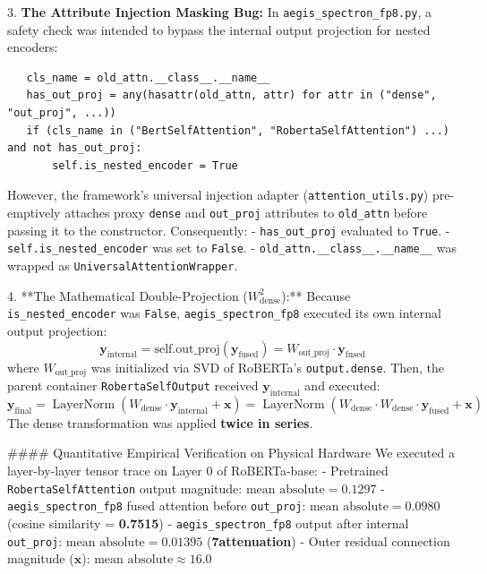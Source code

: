 {{{{3. \textbf{The Attribute Injection Masking Bug:}
   In \texttt{aegis_spectron_fp8.py}, a safety check was intended to bypass the internal output projection for nested encoders:
   
\begin{lstlisting}
   cls_name = old_attn.__class__.__name__
   has_out_proj = any(hasattr(old_attn, attr) for attr in ("dense", "out_proj", ...))
   if (cls_name in ("BertSelfAttention", "RobertaSelfAttention") ...) and not has_out_proj:
       self.is_nested_encoder = True
\end{lstlisting}

   However, the framework's universal injection adapter (\texttt{attention_utils.py}) pre-emptively attaches proxy \texttt{dense} and \texttt{out_proj} attributes to \texttt{old_attn} before passing it to the constructor. Consequently:
   - \texttt{has_out_proj} evaluated to \texttt{True}.
   - \texttt{self.is_nested_encoder} was set to \texttt{False}.
   - \texttt{old_attn.__class__.__name__} was wrapped as \texttt{UniversalAttentionWrapper}.

4. **The Mathematical Double-Projection ($W_{\text{dense}}^2$):**
   Because \texttt{is_nested_encoder} was \texttt{False}, \texttt{aegis_spectron_fp8} executed its own internal output projection:
   $$\mathbf{y}_{\text{internal}} = \text{self.out\_proj}(\mathbf{y}_{\text{fused}}) = W_{\text{out\_proj}} \cdot \mathbf{y}_{\text{fused}}$$
   where $W_{\text{out\_proj}}$ was initialized via SVD of RoBERTa's \texttt{output.dense}.
   Then, the parent container \texttt{RobertaSelfOutput} received $\mathbf{y}_{\text{internal}}$ and executed:
   $$\mathbf{y}_{\text{final}} = \operatorname{LayerNorm}\left( W_{\text{dense}} \cdot \mathbf{y}_{\text{internal}} + \mathbf{x} \right) = \operatorname{LayerNorm}\left( W_{\text{dense}} \cdot W_{\text{dense}} \cdot \mathbf{y}_{\text{fused}} + \mathbf{x} \right)$$
   The dense transformation was applied \textbf{twice in series}.

#### Quantitative Empirical Verification on Physical Hardware
We executed a layer-by-layer tensor trace on Layer 0 of RoBERTa-base:
- Pretrained \texttt{RobertaSelfAttention} output magnitude: $\text{mean absolute} = \mathbf{0.1297}$
- \texttt{aegis_spectron_fp8} fused attention before \texttt{out_proj}: $\text{mean absolute} = \mathbf{0.0980}$ (cosine similarity = \textbf{0.7515})
- \texttt{aegis_spectron_fp8} output after internal \texttt{out_proj}: $\text{mean absolute} = \mathbf{0.01395}$ (\textbf{7\times  attenuation})
- Outer residual connection magnitude ($\mathbf{x}$): $\text{mean absolute} \approx \mathbf{16.0}$

}}}}
